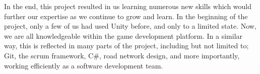         In the end, this project resulted in us learning numerous new skills which would further our expertise as we continue to grow and learn. In the beginning of the project, only a few of us had used Unity before, and only to a limited state. Now, we are all knowledgeable within the game development platform. In a similar way, this is reflected in many parts of the project, including but not limited to; Git, the scrum framework, C\#, road network design, and more importantly, working efficiently as a software development team.
